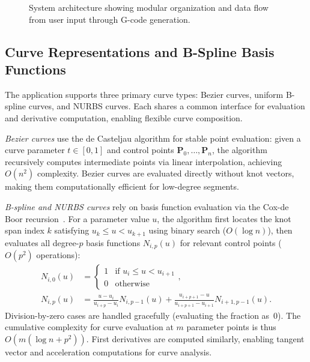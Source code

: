 \documentclass[a4paper,12pt]{article}
\begin{document}
\begin{figure}[H]
  \centering
  \caption{System architecture showing modular organization and data flow from
           user input through G-code generation.}
  \label{fig:blockdiagram}
\end{figure}

\subsection{Curve Representations and B-Spline Basis Functions}

The application supports three primary curve types: Bezier curves, uniform
B-spline curves, and NURBS curves. Each shares a common interface for
evaluation and derivative computation, enabling flexible curve composition.

\emph{Bezier curves} use the de Casteljau algorithm for stable point
evaluation: given a curve parameter $t \in [0, 1]$ and control points
$\mathbf{P}_0, \ldots, \mathbf{P}_n$, the algorithm recursively computes
intermediate points via linear interpolation, achieving $O(n^2)$ complexity.
Bezier curves are evaluated directly without knot vectors, making them
computationally efficient for low-degree segments.

\emph{B-spline and NURBS curves} rely on basis function evaluation via the
Cox-de Boor recursion~\cite{ref2}. For a parameter value $u$, the algorithm
first locates the knot span index $k$ satisfying $u_k \le u < u_{k+1}$ using
binary search ($O(\log n)$), then evaluates all degree-$p$ basis functions
$N_{i,p}(u)$ for relevant control points ($O(p^2)$ operations):
\begin{align}
  N_{i,0}(u) &= \begin{cases}
    1 & \text{if } u_i \le u < u_{i+1} \\
    0 & \text{otherwise}
  \end{cases}, \\
  N_{i,p}(u) &= \frac{u - u_i}{u_{i+p} - u_i} N_{i,p-1}(u) +
    \frac{u_{i+p+1} - u}{u_{i+p+1} - u_{i+1}} N_{i+1,p-1}(u).
\end{align}
Division-by-zero cases are handled gracefully (evaluating the fraction as~0).
The cumulative complexity for curve evaluation at $m$ parameter points is thus
$O(m(\log n + p^2))$. First derivatives are computed similarly, enabling
tangent vector and acceleration computations for curve analysis.
\end{document}
